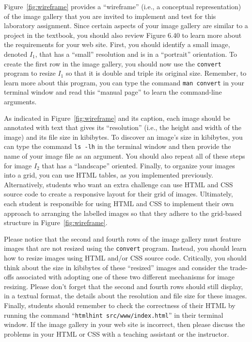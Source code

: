 \documentclass[11pt]{article}
\newcommand{\command}[1]{``\lstinline{#1}''}
\newcommand{\program}[1]{\lstinline{#1}}
\begin{document}
Figure~\ref{fig:wireframe} provides a ``wireframe'' (i.e., a conceptual
representation) of the image gallery that you are invited to implement and test
for this laboratory assignment. Since certain aspects of your image gallery are
similar to a project in the textbook, you should also review Figure 6.40 to
learn more about the requirements for your web site. First, you should identify
a small image, denoted $I_1$, that has a ``small'' resolution and is in a
``portrait'' orientation. To create the first row in the image gallery, you
should now use the \program{convert} program to resize $I_1$ so that it is
double and triple its original size. Remember, to learn more about this program,
you can type the command \program{man convert} in your terminal window and read
this ``manual page'' to learn the command-line arguments.

As indicated in Figure~\ref{fig:wireframe} and its caption, each image should be
annotated with text that gives its ``resolution'' (i.e., the height and width of
the image) and its file size in kibibytes. To discover an image's size in
kibibytes, you can type the command \program{ls -lh} in the terminal window and
then provide the name of your image file as an argument. You should also repeat
all of these steps for image $I_2$ that has a ``landscape'' oriented. Finally,
to organize your images into a grid, you can use HTML tables, as you implemented
previously. Alternatively, students who want an extra challenge can use HTML and
CSS source code to create a responsive layout for their grid of images.
Ultimately, each student is responsible for using HTML and CSS to implement
their own approach to arranging the labelled images so that they adhere to the
grid-based structure in Figure~\ref{fig:wireframe}.

Please notice that the second and fourth rows of the image gallery must feature
images that are not resized using the \program{convert} program. Instead, you
should learn how to resize images using HTML and/or CSS source code. Critically,
you should think about the size in kibibytes of these ``resized'' images and
consider the trade-offs associated with adopting one of these two different
mechanisms for image resizing. Please don't forget that the second and fourth
rows should still display, in a textual format, the details about the resolution
and file size for these images. Finally, students should remember to check the
correctness of their HTML by running the command \command{htmlhint
src/www/index.html} in their terminal window. If the image gallery in your web
site is incorrect, then please discuss the problems in your HTML or CSS with a
teaching assistant or the instructor.
\end{document}
